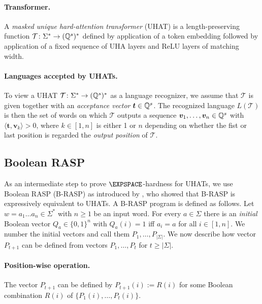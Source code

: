 \paragraph{Transformer.}
A \emph{masked unique hard-attention transformer} (UHAT) is a length-preserving function
$\mathcal{T} \colon \Sigma^* \to (\mathbb{Q}^s)^*$
defined by application of a token embedding followed 
by application of a fixed sequence of UHA layers and ReLU layers of matching width.

\paragraph{Languages accepted by UHATs.}
To view a UHAT $\mathcal{T} \colon \Sigma^* \to (\mathbb{Q}^s)^*$ as a language recognizer, 
we assume that $\mathcal{T}$ is given together with an \emph{acceptance vector} $\bm t \in \mathbb{Q}^s$.
The recognized language $L(\mathcal{T})$ is then the set of words on which $\mathcal{T}$ outputs a sequence
$\bm v_1,\dots,\bm v_n \in \mathbb{Q}^s$ with $\langle \bm t,\bm v_k \rangle > 0$,
where $k \in [1,n]$ is either 1 or $n$ depending on whether the fist or last position 
is regarded the \emph{output position} of $\mathcal{T}$.

\subsection{Boolean RASP}
As an intermediate step to prove $\EXPSPACE$-hardness for UHATs,
we use Boolean RASP (\mbox{B-RASP}) as introduced by \cite{YangCA24},
who showed that B-RASP is expressively equivalent to UHATs. 
A B-RASP program is defined as follows.
Let $w = a_1 \dots a_n \in \Sigma^*$ with $n \ge 1$ be an input word.
For every $a \in \Sigma$ there is an \emph{initial} Boolean vector 
$Q_a \in \{0,1\}^n$ with $Q_a(i) = 1$ iff $a_i = a$ for all $i \in [1,n]$.
We number the initial vectors and call them $P_1,\dots,P_{|\Sigma|}$.
We now describe how vector $P_{t+1}$ can be defined from vectors $P_1,\dots,P_t$ for $t \ge |\Sigma|$.

\paragraph{Position-wise operation.} 
The vector $P_{t+1}$ can be defined by $P_{t+1}(i) := R(i)$ for some Boolean combination $R(i)$ of $\{P_1(i),\dots,P_t(i)\}$.

